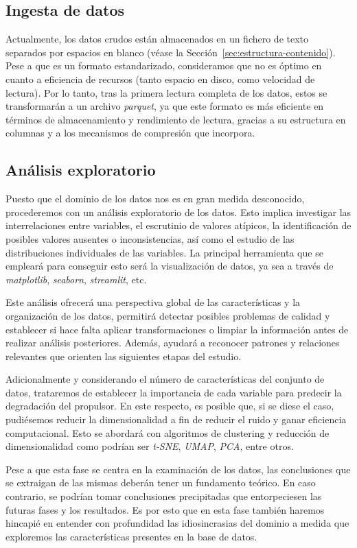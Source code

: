 \documentclass[a4paper]{article}
\begin{document}
  \subsection{Ingesta de datos}
    Actualmente, los datos crudos están almacenados en un fichero de texto separados por espacios en blanco (véase la Sección~\ref{sec:estructura-contenido}). Pese a que es un formato estandarizado, consideramos que no es óptimo en cuanto a eficiencia de recursos (tanto espacio en disco, como velocidad de lectura). Por lo tanto, tras la primera lectura completa de los datos, estos se transformarán a un archivo \textit{parquet}, ya que este formato es más eficiente en términos de almacenamiento y rendimiento de lectura, gracias a su estructura en columnas y a los mecanismos de compresión que incorpora.
    
  \subsection{Análisis exploratorio}
    Puesto que el dominio de los datos nos es en gran medida desconocido, procederemos con un análisis exploratorio de los datos. Esto implica investigar las interrelaciones entre variables, el escrutinio de valores atípicos, la identificación de posibles valores ausentes o inconsistencias, así como el estudio de las distribuciones individuales de las variables. La principal herramienta que se empleará para conseguir esto será la visualización de datos, ya sea a través de \textit{matplotlib}, \textit{seaborn}, \textit{streamlit}, etc.

    Este análisis ofrecerá una perspectiva global de las características y la organización de los datos, permitirá detectar posibles problemas de calidad y establecer si hace falta aplicar transformaciones o limpiar la información antes de realizar análisis posteriores. Además, ayudará a reconocer patrones y relaciones relevantes que orienten las siguientes etapas del estudio.

    Adicionalmente y considerando el número de características del conjunto de datos,  trataremos de establecer la importancia de cada variable para predecir la degradación del propulsor. En este respecto, es posible que, si se diese el caso, pudiésemos reducir la dimensionalidad a fin de reducir el ruido y ganar eficiencia computacional. Esto se abordará con algoritmos de clustering y reducción de dimensionalidad como podrían ser \textit{t-SNE}, \textit{UMAP}, \textit{PCA}, entre otros.

    Pese a que esta fase se centra en la examinación de los datos, las conclusiones que se extraigan de las mismas deberán tener un fundamento teórico. En caso contrario, se podrían tomar conclusiones precipitadas que entorpeciesen las futuras fases y los resultados. Es por esto que en esta fase también haremos hincapié en entender con profundidad las idiosincrasias del dominio a medida que exploremos las características presentes en la base de datos.
    
\end{document}
